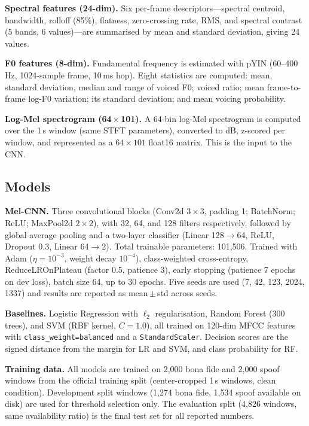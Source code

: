 \documentclass[conference]{IEEEtran}
\begin{document}
\textbf{Spectral features (24-dim).}
Six per-frame descriptors---spectral centroid, bandwidth, rolloff (85\%), flatness, zero-crossing rate, RMS, and spectral contrast (5 bands, 6 values)---are summarised by mean and standard deviation, giving 24 values.

\textbf{F0 features (8-dim).}
Fundamental frequency is estimated with pYIN (60--400\,Hz, 1024-sample frame, 10\,ms hop). Eight statistics are computed: mean, standard deviation, median and range of voiced F0; voiced ratio; mean frame-to-frame log-F0 variation; its standard deviation; and mean voicing probability.

\textbf{Log-Mel spectrogram (64\,$\times$\,101).}
A 64-bin log-Mel spectrogram is computed over the 1\,s window (same STFT parameters), converted to dB, z-scored per window, and represented as a $64\times101$ float16 matrix. This is the input to the CNN.

\subsection{Models}

\textbf{Mel-CNN.}
Three convolutional blocks (Conv2d $3\!\times\!3$, padding 1; BatchNorm; ReLU; MaxPool2d $2\!\times\!2$), with 32, 64, and 128 filters respectively, followed by global average pooling and a two-layer classifier (Linear 128$\rightarrow$64, ReLU, Dropout 0.3, Linear 64$\rightarrow$2). Total trainable parameters: 101,506. Trained with Adam ($\eta=10^{-3}$, weight decay $10^{-4}$), class-weighted cross-entropy, ReduceLROnPlateau (factor 0.5, patience 3), early stopping (patience 7 epochs on dev loss), batch size 64, up to 30 epochs. Five seeds are used (7, 42, 123, 2024, 1337) and results are reported as mean\,$\pm$\,std across seeds.

\textbf{Baselines.}
Logistic Regression with $\ell_2$ regularisation, Random Forest (300 trees), and SVM (RBF kernel, $C=1.0$), all trained on 120-dim MFCC features with \texttt{class\_weight=balanced} and a \texttt{StandardScaler}. Decision scores are the signed distance from the margin for LR and SVM, and class probability for RF.

\textbf{Training data.}
All models are trained on 2,000 bona fide and 2,000 spoof windows from the official training split (center-cropped 1\,s windows, clean condition). Development split windows (1,274 bona fide, 1,534 spoof available on disk) are used for threshold selection only. The evaluation split (4,826 windows, same availability ratio) is the final test set for all reported numbers.
\end{document}

